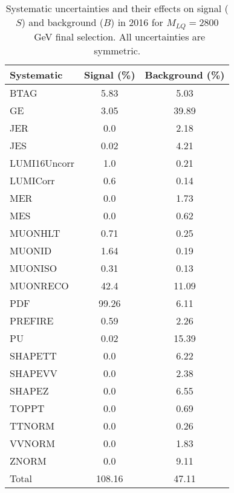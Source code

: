 \begin{table}[htbp]
\begin{center}
\caption{Systematic uncertainties and their effects on signal ($S$) and background ($B$) in 2016 for $M_{LQ}=2800$~GeV final selection. All uncertainties are symmetric.}
\begin{tabular}{lcc}
\hline\hline
Systematic & Signal (\%) & Background (\%) \\ \hline 
BTAG & 5.83 & 5.03\\ 
GE & 3.05 & 39.89\\ 
JER & 0.0 & 2.18\\ 
JES & 0.02 & 4.21\\ 
LUMI16Uncorr & 1.0 & 0.21\\ 
LUMICorr & 0.6 & 0.14\\ 
MER & 0.0 & 1.73\\ 
MES & 0.0 & 0.62\\ 
MUONHLT & 0.71 & 0.25\\ 
MUONID & 1.64 & 0.19\\ 
MUONISO & 0.31 & 0.13\\ 
MUONRECO & 42.4 & 11.09\\ 
PDF & 99.26 & 6.11\\ 
PREFIRE & 0.59 & 2.26\\ 
PU & 0.02 & 15.39\\ 
SHAPETT & 0.0 & 6.22\\ 
SHAPEVV & 0.0 & 2.38\\ 
SHAPEZ & 0.0 & 6.55\\ 
TOPPT & 0.0 & 0.69\\ 
TTNORM & 0.0 & 0.26\\ 
VVNORM & 0.0 & 1.83\\ 
ZNORM & 0.0 & 9.11\\ 
Total & 108.16 & 47.11\\ \hline \hline
\end{tabular}
\label{tab:SysUncertainties_uujj_2800}
\end{center}
\end{table}

